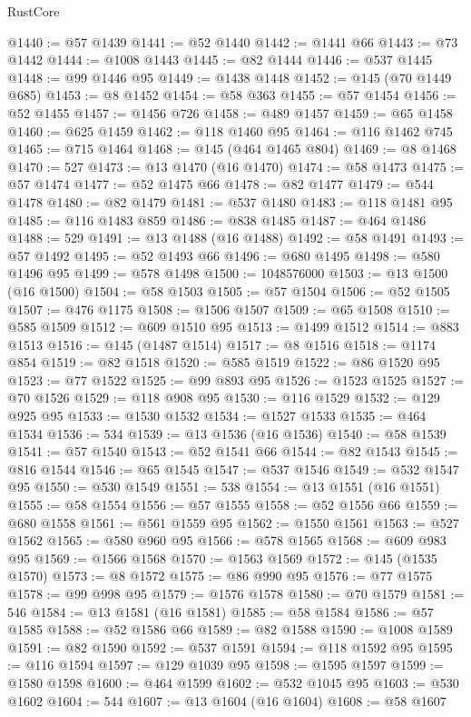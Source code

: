 \begin{lexlean}{RustCore}
\begin{coremodule}
@1440 := @57 @1439
@1441 := @52 @1440
@1442 := @1441 @66
@1443 := @73 @1442
@1444 := @1008 @1443
@1445 := @82 @1444
@1446 := @537 @1445
@1448 := @99 @1446 @95
@1449 := @1438 @1448
@1452 := @145 (@70 @1449 @685)
@1453 := @8 @1452
@1454 := @58 @363
@1455 := @57 @1454
@1456 := @52 @1455
@1457 := @1456 @726
@1458 := @489 @1457
@1459 := @65 @1458
@1460 := @625 @1459
@1462 := @118 @1460 @95
@1464 := @116 @1462 @745
@1465 := @715 @1464
@1468 := @145 (@464 @1465 @804)
@1469 := @8 @1468
@1470 := 527
@1473 := @13 @1470 (@16 @1470)
@1474 := @58 @1473
@1475 := @57 @1474
@1477 := @52 @1475 @66
@1478 := @82 @1477
@1479 := @544 @1478
@1480 := @82 @1479
@1481 := @537 @1480
@1483 := @118 @1481 @95
@1485 := @116 @1483 @859
@1486 := @838 @1485
@1487 := @464 @1486
@1488 := 529
@1491 := @13 @1488 (@16 @1488)
@1492 := @58 @1491
@1493 := @57 @1492
@1495 := @52 @1493 @66
@1496 := @680 @1495
@1498 := @580 @1496 @95
@1499 := @578 @1498
@1500 := 1048576000
@1503 := @13 @1500 (@16 @1500)
@1504 := @58 @1503
@1505 := @57 @1504
@1506 := @52 @1505
@1507 := @476 @1175
@1508 := @1506 @1507
@1509 := @65 @1508
@1510 := @585 @1509
@1512 := @609 @1510 @95
@1513 := @1499 @1512
@1514 := @883 @1513
@1516 := @145 (@1487 @1514)
@1517 := @8 @1516
@1518 := @1174 @854
@1519 := @82 @1518
@1520 := @585 @1519
@1522 := @86 @1520 @95
@1523 := @77 @1522
@1525 := @99 @893 @95
@1526 := @1523 @1525
@1527 := @70 @1526
@1529 := @118 @908 @95
@1530 := @116 @1529
@1532 := @129 @925 @95
@1533 := @1530 @1532
@1534 := @1527 @1533
@1535 := @464 @1534
@1536 := 534
@1539 := @13 @1536 (@16 @1536)
@1540 := @58 @1539
@1541 := @57 @1540
@1543 := @52 @1541 @66
@1544 := @82 @1543
@1545 := @816 @1544
@1546 := @65 @1545
@1547 := @537 @1546
@1549 := @532 @1547 @95
@1550 := @530 @1549
@1551 := 538
@1554 := @13 @1551 (@16 @1551)
@1555 := @58 @1554
@1556 := @57 @1555
@1558 := @52 @1556 @66
@1559 := @680 @1558
@1561 := @561 @1559 @95
@1562 := @1550 @1561
@1563 := @527 @1562
@1565 := @580 @960 @95
@1566 := @578 @1565
@1568 := @609 @983 @95
@1569 := @1566 @1568
@1570 := @1563 @1569
@1572 := @145 (@1535 @1570)
@1573 := @8 @1572
@1575 := @86 @990 @95
@1576 := @77 @1575
@1578 := @99 @998 @95
@1579 := @1576 @1578
@1580 := @70 @1579
@1581 := 546
@1584 := @13 @1581 (@16 @1581)
@1585 := @58 @1584
@1586 := @57 @1585
@1588 := @52 @1586 @66
@1589 := @82 @1588
@1590 := @1008 @1589
@1591 := @82 @1590
@1592 := @537 @1591
@1594 := @118 @1592 @95
@1595 := @116 @1594
@1597 := @129 @1039 @95
@1598 := @1595 @1597
@1599 := @1580 @1598
@1600 := @464 @1599
@1602 := @532 @1045 @95
@1603 := @530 @1602
@1604 := 544
@1607 := @13 @1604 (@16 @1604)
@1608 := @58 @1607

\end{coremodule}
\end{lexlean}
